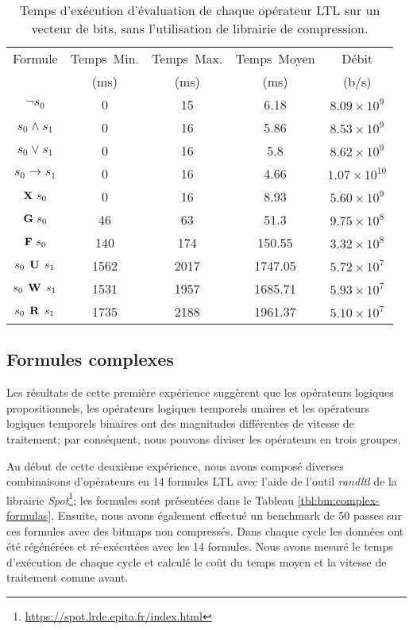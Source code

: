 \begin{table}
\centering
\small
\begin{tabular}{|c|c|c|c|c|}
\hline
Formule & Temps\ Min. & Temps\ Max. & Temps\ Moyen & Débit \\
& (ms) & (ms) & (ms) & (b/s) \\
\hline
$\neg s_0$ & 0 & 15 & 6.18 & $8.09 \times 10^{9}$ \\
\hline
$s_0 \wedge s_1$ & 0 & 16 & 5.86 & $8.53 \times 10^{9}$ \\
\hline
$s_0 \vee s_1$ & 0 & 16 & 5.8 & $8.62 \times 10^{9}$ \\
\hline
$s_0 \rightarrow s_1$ & 0 & 16 & 4.66 & $1.07 \times 10^{10}$ \\
\hline
$\mathop{\mbox{\textbf{X}}}\, s_0$ & 0 & 16 & 8.93 & $5.60 \times 10^{9}$ \\
\hline
$\mathop{\mbox{\textbf{G}}}\, s_0$ & 46 & 63 & 51.3 & $9.75 \times 10^8$ \\
\hline
$\mathop{\mbox{\textbf{F}}}\, s_0$ & 140 & 174 & 150.55 & $3.32 \times 10^8$ \\
\hline
$s_0 \mathrel{\mbox{\,\textbf{U}}}\, s_1$ & 1562 & 2017 & 1747.05 & $5.72 \times 10^7$ \\
\hline
$s_0 \mathrel{\mbox{\,\textbf{W}}}\, s_1$ & 1531 & 1957 & 1685.71 & $5.93 \times 10^7$ \\
\hline
$s_0 \mathrel{\mbox{\,\textbf{R}}}\, s_1$ & 1735 & 2188 & 1961.37 & $5.10 \times 10^7$ \\
\hline
\end{tabular}
\vskip 8pt
\caption{Temps d'exécution d'évaluation de chaque opérateur LTL sur un vecteur de bits, sans l'utilisation de librairie de compression.}
\label{tbl:bm:basicops}
\end{table}


\subsection{Formules complexes} %

Les résultats de cette première expérience suggèrent que les opérateurs logiques propositionnels, les opérateurs logiques temporels unaires et les opérateurs logiques temporels binaires ont des magnitudes différentes de vitesse de traitement; par conséquent, nous pouvons diviser les opérateurs en trois groupes.

Au début de cette deuxième expérience, nous avons composé diverses combinaisons d'opérateurs en 14 formules LTL avec l'aide de l'outil \emph {randltl} de la librairie \textit{Spot}\footnote{\url{https://spot.lrde.epita.fr/index.html}}; les formules sont présentées dans le Tableau \ref{tbl:bm:complex-formulas}. Ensuite, nous avons également effectué un benchmark de 50 passes sur ces formules avec des bitmaps non compressés. Dans chaque cycle les données ont été régénérées et ré-exécutées avec les 14 formules. Nous avons mesuré le temps d'exécution de chaque cycle et calculé le coût du temps moyen et la vitesse de traitement comme avant.

